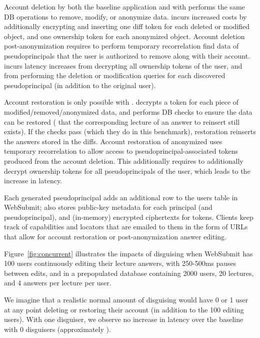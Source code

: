 Account deletion by both the baseline application and with \sys performs the same DB operations to remove, modify, or
anonymize data.  \sys incurs increased costs by additionally encrypting and inserting one diff token
for each deleted or modified object, and one ownership token for each anonymized object.  Account
deletion post-anonymization requires \sys to perform temporary recorrelation find data of
pseudoprincipals that the user is authorized to remove along with their account.  \sys incurs
latency increases from decrypting all ownership tokens of the user, and from performing the deletion
or modification queries for each discovered pseudoprincipal (in addition to the original user).

Account restoration is only possible with \sys. \sys decrypts a token for each piece of
modified/removed/anonymized data, and performs DB checks to ensure the data can be restored (\eg
that the corresponding lecture of an answer to reinsert still exists). If the checks pass (which
they do in this benchmark), restoration reinserts the answers stored in the diffs.
Account restoration of anonymized uses temporary recorrelation to allow \sys access to 
pseudoprincipal-associated tokens produced from the account deletion.
This additionally requires \sys to additionally decrypt ownership tokens for all
pseudoprincipals of the user, which leads to the increase in latency.

Each generated pseudoprincipal adds an additional row to the users table in WebSubmit; \sys also
stores public-key metadata for each principal (and pseudoprincipal), and (in-memory) encrypted
ciphertexts for tokens.  Clients keep track of capabilities and locators that are emailed to them in
the form of URLs that allow for account restoration or post-anonymization answer editing.

 Figure~\ref{fig:concurrent} illustrates the
impacts of disguising when WebSubmit has 100 users continuously editing their lecture answers, with
250-500ms pauses between edits, and in a prepopulated database containing 2000 users, 20 lectures,
and 4 answers per lecture per user.

We imagine that a realistic normal amount of disguising would have 0 or 1 user at any point deleting
or restoring their account (in addition to the 100 editing users). With one disguiser, we observe no
increase in latency over the baseline with 0 disguisers (approximately ). 

